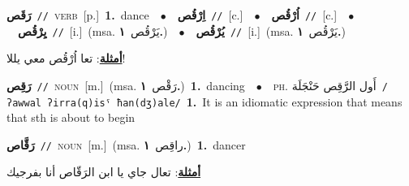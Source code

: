 \documentclass[10pt,a4paper,twoside]{article} %
\begin{document}
\begin{multicols}{2}
{\setlength\topsep{0pt}\textbf{\foreignlanguage{arabic}{رَقَص}}\ {\color{gray}\texttt{//}\color{black}}\ \textsc{verb}\ [p.]\ \textbf{1.}~dance\ \ $\bullet$\ \ \setlength\topsep{0pt}\textbf{\foreignlanguage{arabic}{اِرْقُص}}\ {\color{gray}\texttt{//}\color{black}}\ [c.]\ \ $\bullet$\ \ \setlength\topsep{0pt}\textbf{\foreignlanguage{arabic}{اُرْقُص}}\ {\color{gray}\texttt{//}\color{black}}\ [c.]\ \ $\bullet$\ \ \setlength\topsep{0pt}\textbf{\foreignlanguage{arabic}{يِرْقُص}}\ {\color{gray}\texttt{//}\color{black}}\ [i.]\ \color{gray}(msa. \foreignlanguage{arabic}{يَرْقُص}~\foreignlanguage{arabic}{\textbf{١.}})\color{black}\ \ $\bullet$\ \ \setlength\topsep{0pt}\textbf{\foreignlanguage{arabic}{يُرْقُص}}\ {\color{gray}\texttt{//}\color{black}}\ [i.]\ \color{gray}(msa. \foreignlanguage{arabic}{يَرْقُص}~\foreignlanguage{arabic}{\textbf{١.}})\color{black}\  \begin{flushright}\color{gray}\foreignlanguage{arabic}{\textbf{\underline{\foreignlanguage{arabic}{أمثلة}}}: تعا اُرْقُص معي يللا!}\end{flushright}\color{black}} \vspace{2mm}

{\setlength\topsep{0pt}\textbf{\foreignlanguage{arabic}{رَقِص}}\ {\color{gray}\texttt{//}\color{black}}\ \textsc{noun}\ [m.]\ \color{gray}(msa. \foreignlanguage{arabic}{رَقْص}~\foreignlanguage{arabic}{\textbf{١.}})\color{black}\ \textbf{1.}~dancing\ \ $\bullet$\ \ \textsc{ph.} \color{gray} \foreignlanguage{arabic}{أَول الرَّقِص حَنْجَلَة}\color{black}\ {\color{gray}\texttt{/{\sffamily ʔawwal ʔirra(q)isˤ ħan(dʒ)ale}/}\color{black}}\ \textbf{1.}~It is an idiomatic expression that means that sth is about to begin\ } \vspace{2mm}

{\setlength\topsep{0pt}\textbf{\foreignlanguage{arabic}{رَقَّاص}}\ {\color{gray}\texttt{//}\color{black}}\ \textsc{noun}\ [m.]\ \color{gray}(msa. \foreignlanguage{arabic}{راقِص}~\foreignlanguage{arabic}{\textbf{١.}})\color{black}\ \textbf{1.}~dancer\  \begin{flushright}\color{gray}\foreignlanguage{arabic}{\textbf{\underline{\foreignlanguage{arabic}{أمثلة}}}: تعال جاي يا ابن الرَقّاص أنا بفرجيك}\end{flushright}\color{black}} \vspace{2mm}


\end{multicols}
\end{document}
